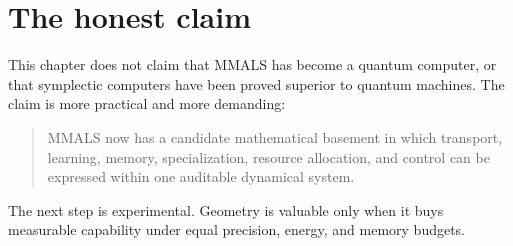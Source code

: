 \section*{The honest claim}
This chapter does not claim that MMALS has become a quantum computer, or that symplectic computers have been proved superior to quantum machines. The claim is more practical and more demanding:

\begin{quote}
MMALS now has a candidate mathematical basement in which transport, learning, memory, specialization, resource allocation, and control can be expressed within one auditable dynamical system.
\end{quote}

The next step is experimental. Geometry is valuable only when it buys measurable capability under equal precision, energy, and memory budgets.

